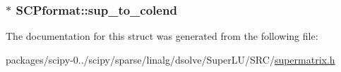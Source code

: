\subsubsection[{sup\+\_\+to\+\_\+colend}]{$\ast$ S\+C\+Pformat\+::sup\+\_\+to\+\_\+colend}\label{structSCPformat_a8e470d085ca7b39645336943a1f2eae6}


The documentation for this struct was generated from the following file\+:\begin{DoxyCompactItemize}
\item 
packages/scipy-\/0../scipy/sparse/linalg/dsolve/\+Super\+L\+U/\+S\+R\+C/\hyperlink{supermatrix_8h}{supermatrix.\+h}\end{DoxyCompactItemize}
